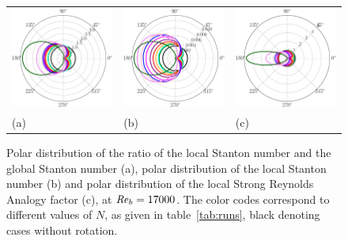\documentclass[lineno]{jfm}
\begin{document}
	\begin{figure}
                \centering
                \begin{tabular}{lll}
		\includegraphics[width=4cm]{Figures/ch_azimuth_global_500.eps} &
		\includegraphics[width=4cm]{Figures/ch_azimuth_local_500.eps} &
                \includegraphics[width=4cm]{Figures/sra_azimuth_local_500.eps} \\
		(a) & (b) & (c) \\
                \end{tabular}
                \caption{
			Polar distribution of the ratio of the local Stanton number and the global Stanton number (a), 
			polar distribution of the local Stanton number (b)  
			and polar distribution of the local Strong Reynolds Analogy factor (c), at $\mbox{\textit{Re}}_b=17000$.
                        The color codes correspond to different values of $N$,
                        as given in table~\ref{tab:runs},
                        black denoting cases without rotation.
                        }
                        \label{fig:Ch__azimuth_polar}
        \end{figure}
\end{document}
